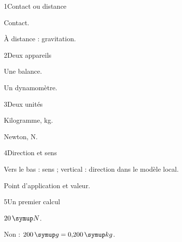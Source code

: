 \par\noindent\begin{minipage}{\linewidth}
\begin{corrige}{1}{Contact ou distance}
\begin{questions}
\item Contact.
\item À distance : gravitation.
\end{questions}
\end{corrige}
\end{minipage}
\par\noindent\begin{minipage}{\linewidth}
\begin{corrige}{2}{Deux appareils}
\begin{questions}
\item Une balance.
\item Un dynamomètre.
\end{questions}
\end{corrige}
\end{minipage}
\par\noindent\begin{minipage}{\linewidth}
\begin{corrige}{3}{Deux unités}
\begin{questions}
\item Kilogramme, kg.
\item Newton, N.
\end{questions}
\end{corrige}
\end{minipage}
\par\noindent\begin{minipage}{\linewidth}
\begin{corrige}{4}{Direction et sens}
\begin{questions}
\item Vers le bas : sens ; vertical : direction dans le modèle local.
\item Point d’application et valeur.
\end{questions}
\end{corrige}
\end{minipage}
\par\noindent\begin{minipage}{\linewidth}
\begin{corrige}{5}{Un premier calcul}
\begin{questions}
\item $20\unite N$.
\item Non : $200\unite g=0{,}200\unite{kg}$.
\end{questions}
\end{corrige}
\end{minipage}
